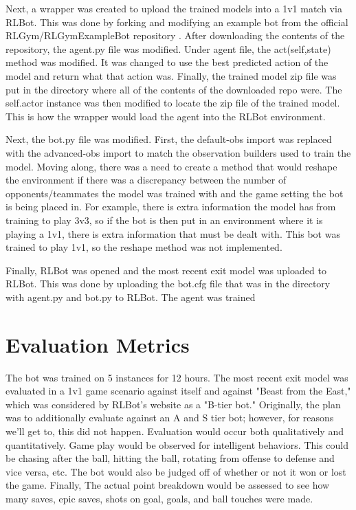 \documentclass[10pt,twocolumn]{article}
\begin{document}
Next, a wrapper was created to upload the trained models into a 1v1 match via RLBot. This was done by forking and modifying an example bot from the official RLGym/RLGymExampleBot repository \cite{github1}. After downloading the contents of the repository, the agent.py file was modified. Under agent file, the act(self,state) method was modified. It was changed to use the best predicted action of the model and return what that action was. Finally, the trained model zip file was put in the directory where all of the contents of the downloaded repo were. The self.actor instance was then modified to locate the zip file of the trained model. This is how the wrapper would load the agent into the RLBot environment. 

Next, the bot.py file was modified. First, the default-obs import was replaced with the advanced-obs import to match the observation builders used to train the model. Moving along, there was a need to create a method that would reshape the environment if there was a discrepancy between the number of opponents/teammates the model was trained with and the game setting the bot is being placed in. For example, there is extra information the model has from training to play 3v3, so if the bot is then put in an environment where it is playing a 1v1, there is extra information that must be dealt with. This bot was trained to play 1v1, so the reshape method was not implemented.

Finally, RLBot was opened and the most recent exit model was uploaded to RLBot. This was done by uploading the bot.cfg file that was in the directory with agent.py and bot.py to RLBot. The agent was trained 

\section{Evaluation Metrics}
The bot was trained on 5 instances for 12 hours. The most recent exit model was evaluated in a 1v1 game scenario against itself and against "Beast from the East," which was considered by RLBot's website  as a "B-tier bot." Originally, the plan was to additionally evaluate against an A and S tier bot; however, for reasons we'll get to, this did not happen. Evaluation would occur both qualitatively and quantitatively. Game play would be observed for intelligent behaviors. This could be chasing after the ball, hitting the ball, rotating from offense to defense and vice versa, etc. The bot would also be judged off of whether or not it won or lost the game. Finally, The actual point breakdown would be assessed to see how many saves, epic saves, shots on goal, goals, and ball touches were made. 
\end{document}
